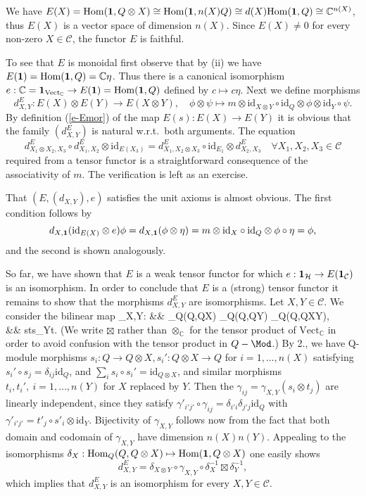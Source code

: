 \documentclass[11pt]{article}
\theoremstyle{definition}
\theoremstyle{definition}
\theoremstyle{remark}
\newcommand{\Vect}{\mathrm{Vect}}
\def\2#1{{\mathcal #1}}
\def\7#1{{\mathbb #1}}
\def\1#1{{\bf #1}}
\newcommand{\Hom}{\mathrm{Hom}}
\newcommand{\mcirc}{\circ}
\newcommand{\rarr}{\rightarrow}
\def\id{\mathrm{id}}
\newcounter{bean}
\begin{document}
\prf We have $E(X) = \Hom(\11,Q\otimes X)\cong\Hom(\11,n(X)Q)\cong d(X)\Hom(\11,Q)\cong \7C^{n(X)}$,
thus $E(X)$ is a vector space of dimension $n(X)$. Since $E(X)\ne 0$ for every non-zero
$X\in\2C$, the functor $E$ is faithful. 

To see that $E$ is monoidal first observe that by (ii) we have
$E(\11)=\Hom(\11,Q)=\7C\eta$. Thus there is a canonical isomorphism
$e: \7C=\11_{\Vect_\7C} \rarr E(\11 )=\Hom(\11,Q)$ defined by
$c\mapsto c\eta$. Next we define morphisms
\[ d^E_{X,Y}: E(X)\otimes E(Y)\rarr E(X\otimes Y), \quad \phi\otimes \psi\mapsto
   m\otimes\id_{X\otimes Y}\mcirc\id_Q\otimes\phi\otimes\id_Y\mcirc\psi. \]
By definition (\ref{e-Emor}) of the map $E(s): E(X)\rarr E(Y)$ it is obvious that the family
$(d^E_{X,Y})$ is natural w.r.t.\ both arguments. The equation
\[ d^E_{X_1\otimes X_2,X_3}\mcirc  d^E_{X_1,X_2}\otimes\id_{E(X_3)}=
   d^E_{X_1, X_2\otimes X_3}\mcirc \id_{E_1}\otimes d^E_{X_2,X_3}  \quad\forall X_1,X_2,X_3\in\2C
\]  
required from a tensor functor is a straightforward consequence of the associativity of $m$. The
verification is left as an exercise.

That $(E, (d_{X,Y}),e)$ satisfies the unit axioms is almost obvious. The first condition follows by 
\[ d_{X,\11}(\id_{E(X)}\otimes
e)\phi=d_{X,\11}(\phi\otimes\eta)=m\otimes\id_X\mcirc\id_Q\otimes\phi\mcirc\eta=\phi,
\] and the second is shown analogously.

So far, we have shown that $E$ is a weak tensor functor for which $e:
\11_\2H\rarr E(\11_\2C)$ is an isomorphism. In order to conclude that
$E$ is a (strong) tensor functor it remains to show that the morphisms
$d^E_{X,Y}$ are isomorphisms. Let $X,Y\in\2C$. We consider the
bilinear map \bean \gamma_{X,Y}: && \Hom_Q(Q,Q\otimes X)\boxtimes
\Hom_Q(Q,Q\otimes Y)\rarr
\Hom_Q(Q,Q\otimes X\otimes Y), \\
&& s\boxtimes t\mapsto s\otimes\id_Y\mcirc t.  \eean (We write
$\boxtimes$ rather than $\otimes_\7C$ for the tensor product of
$\Vect_\7C$ in order to avoid confusion with the tensor product in
$Q-\Mod$.) By 2., we have Q-module morphisms $s_i: Q\rarr Q\otimes X,
s_i': Q\otimes X\rarr Q$ for $i=1,\ldots,n(X)$ satisfying $s_i'\circ
s_j=\delta_{ij}\id_Q$, and $\sum_i s_i\circ s_i'=\id_{Q\otimes X}$,
and similar morphisms $t_i, t_i', \ i=1,\ldots,n(Y)$ for $X$ replaced
by $Y$. Then the $\gamma_{ij}=\gamma_{X,Y}(s_i\otimes t_j)$ are
linearly independent, since they satisfy
$\gamma'_{i'j'}\circ\gamma_{ij}=\delta_{i'i}\delta_{j'j}\id_Q$ with
$\gamma'_{i'j'}=t'_j \mcirc s'_i\otimes\id_Y$. Bijectivity of
$\gamma_{X,Y}$ follows now from the fact that both domain and codomain
of $\gamma_{X,Y}$ have dimension $n(X)n(Y)$.  Appealing to the
isomorphisms $\delta_X: \Hom_Q(Q,Q\otimes X)\mapsto\Hom(\11,Q\otimes
X)$ one easily shows
\[ d^E_{X,Y}= \delta_{X\otimes Y}\mcirc \gamma_{X,Y} \mcirc \delta_X^{-1} \boxtimes \delta_Y^{-1}, \]
which implies that $d^E_{X,Y}$ is an isomorphism for every $X,Y\in\2C$.
\end{document}

